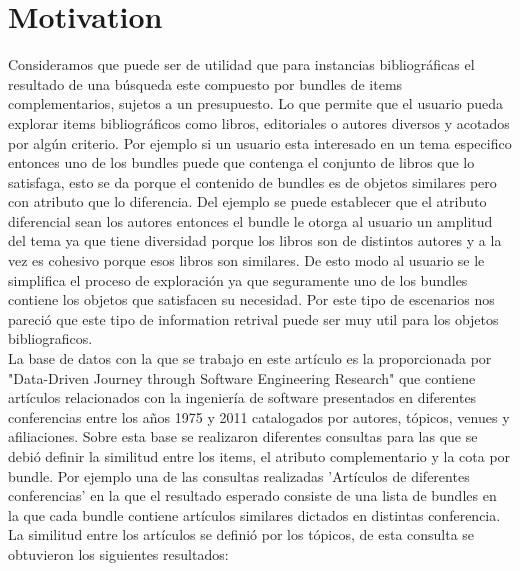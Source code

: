 \section{Motivation}
Consideramos que puede ser de utilidad que para instancias bibliográficas el resultado de una búsqueda este compuesto por bundles de items complementarios, sujetos a un presupuesto. 
Lo que permite que el usuario pueda explorar items bibliográficos como libros, editoriales o autores diversos y acotados por algún criterio. Por ejemplo si un usuario esta interesado en un tema especifico entonces uno de los bundles puede que contenga el conjunto de libros que lo satisfaga, esto se da porque el contenido de bundles es de objetos similares pero con atributo que lo diferencia. Del ejemplo se puede establecer que el atributo diferencial sean los autores entonces el bundle le otorga al usuario un amplitud del tema ya que tiene diversidad porque los libros son de distintos autores y a la vez es cohesivo porque esos libros son similares. De esto modo al usuario se le simplifica el proceso de exploración ya que seguramente uno de los bundles contiene los objetos que satisfacen su necesidad. Por este tipo de escenarios nos pareció que este tipo de information retrival puede ser muy util para los objetos bibliograficos.   \\
La base de datos con la que se trabajo en este artículo es la proporcionada por "Data-Driven Journey through Software Engineering Research" que contiene artículos relacionados con la ingeniería de software presentados en diferentes conferencias entre los años 1975 y 2011 catalogados por autores, tópicos, venues y afiliaciones. Sobre esta base se realizaron diferentes consultas para las que se debió definir la similitud entre los items, el atributo complementario y la cota por bundle. Por ejemplo una de las consultas realizadas 'Artículos de diferentes conferencias'
en la que el resultado esperado consiste de una lista de bundles en la que cada bundle contiene artículos similares dictados en distintas conferencia. La similitud entre los artículos se definió por los tópicos, de esta consulta se obtuvieron los siguientes resultados: